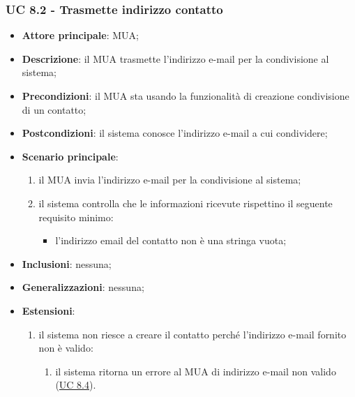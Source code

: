     \subsubsection{UC 8.2 - Trasmette indirizzo contatto} \label{sec:UC8.2}
    \begin{itemize}
        \item \textbf{Attore principale}: MUA;
        \item \textbf{Descrizione}: il MUA trasmette l'indirizzo e-mail per la condivisione al sistema;
        \item \textbf{Precondizioni}: il MUA sta usando la funzionalità di creazione condivisione di un contatto;
        \item \textbf{Postcondizioni}: il sistema conosce l'indirizzo e-mail a cui condividere;
        \item \textbf{Scenario principale}:
            \begin{enumerate}
                \item il MUA invia l'indirizzo e-mail per la condivisione al sistema;
                \item il sistema controlla che le informazioni ricevute rispettino il seguente requisito minimo:
                    \begin{itemize}
                        \item l'indirizzo email del contatto non è una stringa vuota;
                    \end{itemize}
            \end{enumerate}
        \item \textbf{Inclusioni}: nessuna;
        \item \textbf{Generalizzazioni}: nessuna;
        \item \textbf{Estensioni}:
            \begin{enumerate}[label=\alph*.]
                \item il sistema non riesce a creare il contatto perché l'indirizzo e-mail fornito non è valido:
                \begin{enumerate}[label=\arabic*.]
                    \item il sistema ritorna un errore al MUA di indirizzo e-mail non valido (\hyperref[sec:UC8.4]{UC 8.4}).
                \end{enumerate}
            \end{enumerate}
    \end{itemize}


